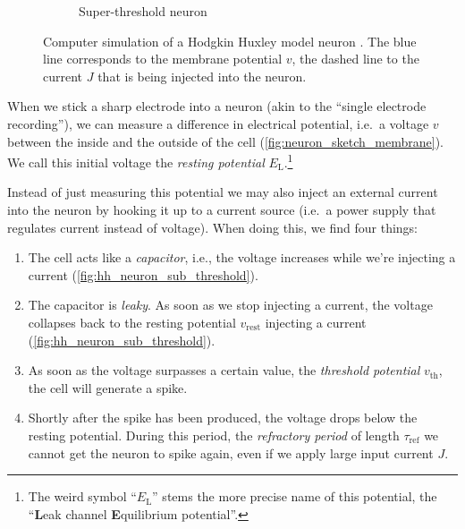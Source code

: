 \documentclass[10pt,letterpaper,oneside]{article}
\begin{document}
\begin{figure}
\begin{subfigure}{0.5\textwidth}
		\caption{Super-threshold neuron}%
		\label{fig:hh_neuron_super_threshold}
	\end{subfigure}%
	\caption{Computer simulation of a Hodgkin Huxley model neuron \cite{hodgkin1952quantitative,traub1991neuronal}. The blue line corresponds to the membrane potential $v$, the dashed line to the current $J$ that is being injected into the neuron.}
\end{figure}

When we stick a sharp electrode into a neuron (akin to the \enquote{single electrode recording}), we can measure a difference in electrical potential, i.e.~a voltage $v$ between the inside and the outside of the cell (\cref{fig:neuron_sketch_membrane}). We call this initial voltage the \emph{resting potential} $E_\mathrm{L}$.\footnote{The weird symbol \enquote{$E_\mathrm{L}$} stems the more precise name of this potential, the \enquote{\textbf{L}eak channel \textbf{E}quilibrium potential}.}

Instead of just measuring this potential we may also inject an external current into the neuron by hooking it up to a current source (i.e.~a power supply that regulates current instead of voltage). When doing this, we find four things:
\begin{enumerate}
	\item The cell acts like a \emph{capacitor}, i.e., the voltage increases while we're injecting a current (\cref{fig:hh_neuron_sub_threshold}).
	\item The capacitor is \emph{leaky}. As soon as we stop injecting a current, the voltage collapses back to the resting potential $v_\mathrm{rest}$ injecting a current (\cref{fig:hh_neuron_sub_threshold}).
	\item As soon as the voltage surpasses a certain value, the \emph{threshold potential} $v_\mathrm{th}$, the cell will generate a spike.
	\item Shortly after the spike has been produced, the voltage drops below the resting potential. During this period, the \emph{refractory period} of length $\tau_\mathrm{ref}$ we cannot get the neuron to spike again, even if we apply large input current $J$.
\end{enumerate}

\end{document}
